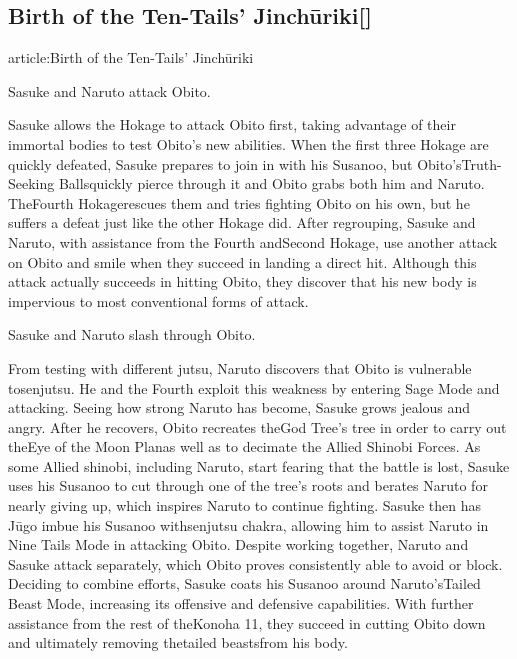 \documentclass[a4paper,12pt]{article}
\begin{document}
\subsection*{Birth of the Ten-Tails' Jinchūriki[]}\n\nMain article:Birth of the Ten-Tails' Jinchūriki\\ \par \vspace{0.5cm}

Sasuke and Naruto attack Obito.\\ \par \vspace{0.5cm}

Sasuke allows the Hokage to attack Obito first, taking advantage of their immortal bodies to test Obito's new abilities. When the first three Hokage are quickly defeated, Sasuke prepares to join in with his Susanoo, but Obito'sTruth-Seeking Ballsquickly pierce through it and Obito grabs both him and Naruto. TheFourth Hokagerescues them and tries fighting Obito on his own, but he suffers a defeat just like the other Hokage did. After regrouping, Sasuke and Naruto, with assistance from the Fourth andSecond Hokage, use another attack on Obito and smile when they succeed in landing a direct hit. Although this attack actually succeeds in hitting Obito, they discover that his new body is impervious to most conventional forms of attack.\\ \par \vspace{0.5cm}

Sasuke and Naruto slash through Obito.\\ \par \vspace{0.5cm}

From testing with different jutsu, Naruto discovers that Obito is vulnerable tosenjutsu. He and the Fourth exploit this weakness by entering Sage Mode and attacking. Seeing how strong Naruto has become, Sasuke grows jealous and angry. After he recovers, Obito recreates theGod Tree's tree in order to carry out theEye of the Moon Planas well as to decimate the Allied Shinobi Forces. As some Allied shinobi, including Naruto, start fearing that the battle is lost, Sasuke uses his Susanoo to cut through one of the tree's roots and berates Naruto for nearly giving up, which inspires Naruto to continue fighting. Sasuke then has Jūgo imbue his Susanoo withsenjutsu chakra, allowing him to assist Naruto in Nine Tails Mode in attacking Obito. Despite working together, Naruto and Sasuke attack separately, which Obito proves consistently able to avoid or block. Deciding to combine efforts, Sasuke coats his Susanoo around Naruto'sTailed Beast Mode, increasing its offensive and defensive capabilities. With further assistance from the rest of theKonoha 11, they succeed in cutting Obito down and ultimately removing thetailed beastsfrom his body.\\ \par \vspace{0.5cm}
\end{document}
